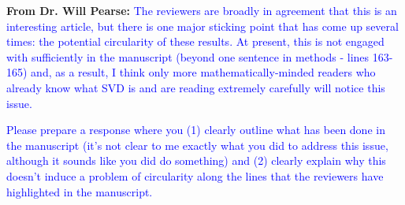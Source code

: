 \documentclass{article}
\begin{document}
\textbf{From Dr. Will Pearse:} 
\textcolor{blue}{The reviewers are broadly in agreement that this is an interesting article, but there is one major sticking point that has come up several times: the potential circularity of these results. At present, this is not engaged with sufficiently in the manuscript (beyond one sentence in methods - lines 163-165) and, as a result, I think only more mathematically-minded readers who already know what SVD is and are reading extremely carefully will notice this issue.}

\textcolor{blue}{Please prepare a response where you (1) clearly outline what has been done in the manuscript (it's not clear to me exactly what you did to address this issue, although it sounds like you did do something) and (2) clearly explain why this doesn't induce a problem of circularity along the lines that the reviewers have highlighted in the manuscript.}
\end{document}
